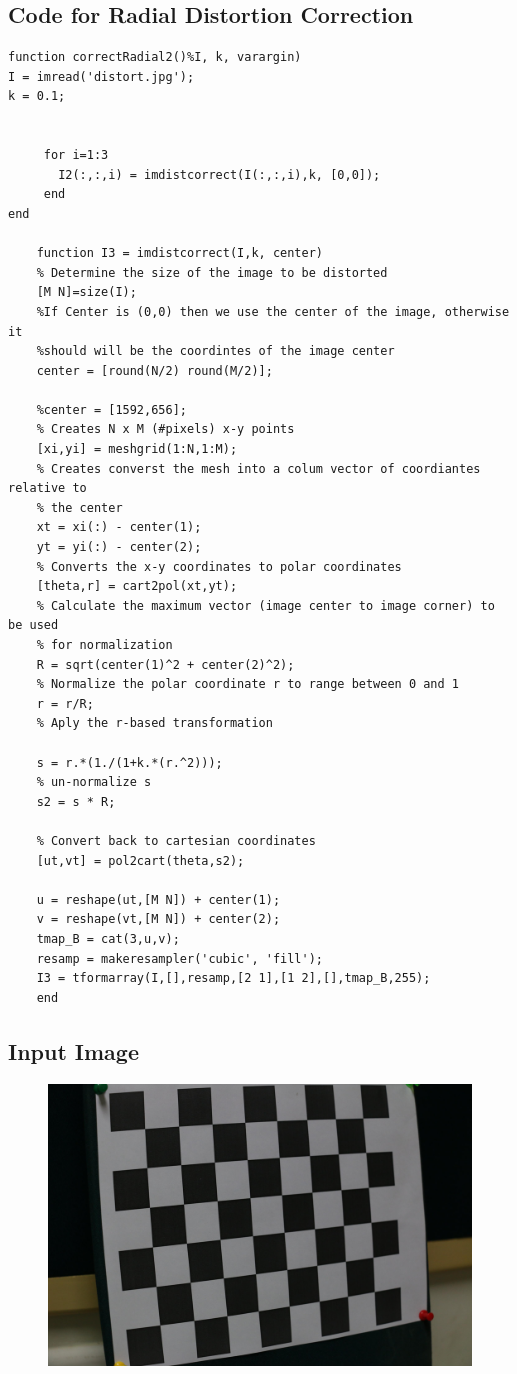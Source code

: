 \documentclass[12pt]{article}
\begin{document}
\subsection{Code for Radial Distortion Correction}
\begin{lstlisting}
function correctRadial2()%I, k, varargin)
I = imread('distort.jpg');
k = 0.1;


     for i=1:3
       I2(:,:,i) = imdistcorrect(I(:,:,i),k, [0,0]);
     end   
end

    function I3 = imdistcorrect(I,k, center)
    % Determine the size of the image to be distorted
    [M N]=size(I);
    %If Center is (0,0) then we use the center of the image, otherwise it
    %should will be the coordintes of the image center
    center = [round(N/2) round(M/2)];

    %center = [1592,656];
    % Creates N x M (#pixels) x-y points
    [xi,yi] = meshgrid(1:N,1:M);
    % Creates converst the mesh into a colum vector of coordiantes relative to
    % the center
    xt = xi(:) - center(1);
    yt = yi(:) - center(2);
    % Converts the x-y coordinates to polar coordinates
    [theta,r] = cart2pol(xt,yt);
    % Calculate the maximum vector (image center to image corner) to be used
    % for normalization
    R = sqrt(center(1)^2 + center(2)^2);
    % Normalize the polar coordinate r to range between 0 and 1 
    r = r/R;
    % Aply the r-based transformation
    
    s = r.*(1./(1+k.*(r.^2)));
    % un-normalize s
    s2 = s * R;
      
    % Convert back to cartesian coordinates
    [ut,vt] = pol2cart(theta,s2);
  
    u = reshape(ut,[M N]) + center(1);
    v = reshape(vt,[M N]) + center(2);
    tmap_B = cat(3,u,v);
    resamp = makeresampler('cubic', 'fill');
    I3 = tformarray(I,[],resamp,[2 1],[1 2],[],tmap_B,255);
    end

\end{lstlisting}

\subsection{Input Image}
\begin{figure}[htp]
\centering
\includegraphics[width=1\textwidth]{distort.jpg}\hfill
\end{figure}
\clearpage
\end{document}
